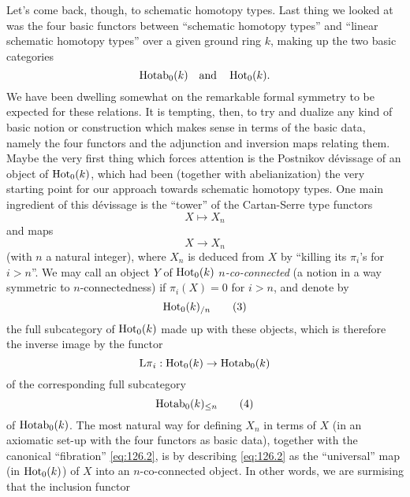 \label{sec:126}%
Let's come back, though, to schematic homotopy types. Last thing we
looked at was the four basic functors between ``schematic homotopy
types'' and ``linear schematic homotopy types'' over a given ground
ring $k$, making up the two basic categories
\[\operatorname{Hotab}_0(k)\quad\text{and}\quad
\operatorname{Hot}_0(k).\]
We have been dwelling somewhat on the remarkable formal symmetry to be
expected for these relations. It is tempting, then, to try and dualize
any kind of basic notion or construction which makes sense in terms of
the basic data, namely the four functors and the adjunction and
inversion maps relating them. Maybe the very first thing which forces
attention is the Postnikov dévissage of an object of $\operatorname{Hot}_0(k)$,
which had been (together with abelianization) the very starting point
for our approach towards schematic homotopy types. One main ingredient
of this dévissage is the ``tower'' of the Cartan-Serre type functors
\begin{equation}
  \label{eq:126.1}
  X\mapsto X_n\tag{1}
\end{equation}
and maps
\begin{equation}
  \label{eq:126.2}
  X\to X_n\tag{2}
\end{equation}
(with $n$ a natural integer), where $X_n$ is deduced from $X$ by
``killing its $\pi_i$'s for $i>n$''. We may call an object $Y$ of
$\operatorname{Hot}_0(k)$ \emph{$n$-co-connected} (a notion in a way symmetric to
$n$-connectedness) if $\pi_i(X)=0$ for $i>n$, and denote by
\begin{equation}
  \label{eq:126.3}
  \operatorname{Hot}_0(k)_{/n}\tag{3}
\end{equation}
the full subcategory of $\operatorname{Hot}_0(k)$ made up with these objects,
which is therefore the inverse image by the functor
\[\operatorname{L\pi}_i : \operatorname{Hot}_0(k)\to\operatorname{Hotab}_0(k)\]
of the corresponding full subcategory
\begin{equation}
  \label{eq:126.4}
  \operatorname{Hotab}_0(k)_{\le n}\tag{4}
\end{equation}
of $\operatorname{Hotab}_0(k)$. The most natural way for defining $X_n$ in terms
of $X$ (in an axiomatic set-up with the four functors as basic data),
together with the canonical ``fibration'' \eqref{eq:126.2}, is by
describing \eqref{eq:126.2} as the ``universal'' map (in
$\operatorname{Hot}_0(k)$) of $X$ into an $n$-co-connected object. In other words,
we are surmising that the inclusion functor
